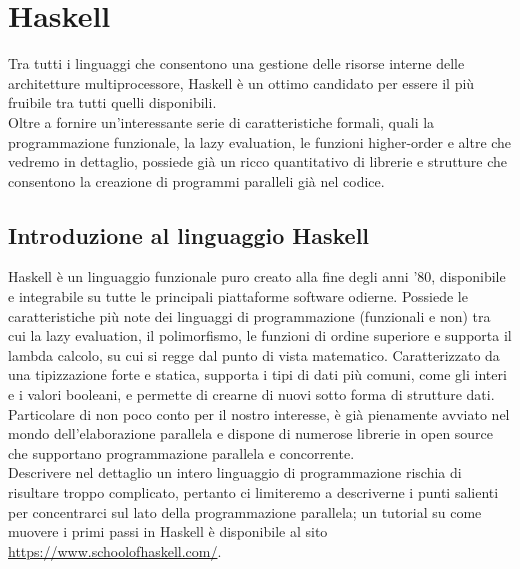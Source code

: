 


\section{Haskell}
Tra tutti i linguaggi che consentono una gestione delle risorse interne delle architetture multiprocessore, Haskell è un ottimo candidato per essere il più fruibile tra tutti quelli disponibili.\\
Oltre a fornire un'interessante serie di caratteristiche formali, quali la programmazione funzionale, la lazy evaluation, le funzioni higher-order e altre che vedremo in dettaglio, possiede già un ricco quantitativo di librerie e strutture che consentono la creazione di programmi paralleli già nel codice.
\subsection{Introduzione al linguaggio Haskell}
Haskell è un linguaggio funzionale puro creato alla fine degli anni '80, disponibile e integrabile su tutte le principali piattaforme software odierne. Possiede le caratteristiche più note dei linguaggi di programmazione (funzionali e non) tra cui la lazy evaluation, il polimorfismo, le funzioni di ordine superiore e supporta il lambda calcolo, su cui si regge dal punto di vista matematico. Caratterizzato da una tipizzazione forte e statica, supporta i tipi di dati più comuni, come gli interi e i valori booleani, e permette di crearne di nuovi sotto forma di strutture dati.\\
Particolare di non poco conto per il nostro interesse, è già pienamente avviato nel mondo dell'elaborazione parallela e dispone di numerose librerie in open source che supportano programmazione parallela e concorrente.\\
Descrivere nel dettaglio un intero linguaggio di programmazione rischia di risultare troppo complicato, pertanto ci limiteremo a descriverne i punti salienti per concentrarci sul lato della programmazione parallela; un tutorial su come muovere i primi passi in Haskell è disponibile al sito \url{https://www.schoolofhaskell.com/}.
